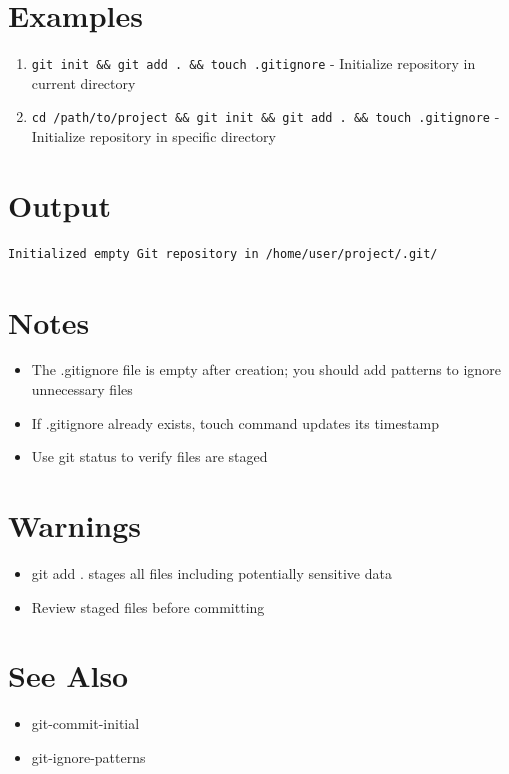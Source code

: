 \documentclass{article}
\begin{document}
\section*{Examples}
\begin{enumerate}
  \item \texttt{git init \&\& git add . \&\& touch .gitignore} - Initialize repository in current directory
  \item \texttt{cd /path/to/project \&\& git init \&\& git add . \&\& touch .gitignore} - Initialize repository in specific directory
\end{enumerate}

\section*{Output}
\begin{lstlisting}
Initialized empty Git repository in /home/user/project/.git/
\end{lstlisting}

\section*{Notes}
\begin{itemize}
  \item The .gitignore file is empty after creation; you should add patterns to ignore unnecessary files
  \item If .gitignore already exists, touch command updates its timestamp
  \item Use git status to verify files are staged
\end{itemize}

\section*{Warnings}
\begin{itemize}
  \item git add . stages all files including potentially sensitive data
  \item Review staged files before committing
\end{itemize}

\section*{See Also}
\begin{itemize}
  \item git-commit-initial
  \item git-ignore-patterns
\end{itemize}
\end{document}
